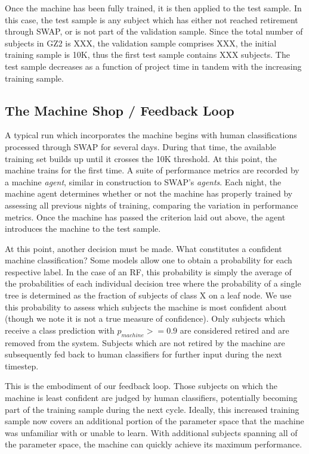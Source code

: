 \documentclass[twocolumn]{aastex6}
\begin{document}
Once the machine has been fully trained, it is then applied to the test sample. 
In this case, the test sample is any subject which has either not reached retirement
through SWAP, or is not part of the validation sample. Since the 
total number of subjects in GZ2 is XXX, the validation sample comprises XXX, 
the initial training sample is 10K, thus the first test sample contains XXX subjects. 
The test sample decreases as a function of project time in tandem with the increasing
training sample. 


\subsection{The Machine Shop / Feedback Loop}
A typical run which incorporates the machine begins with human classifications 
processed through SWAP for several days. During that time, the available training set
builds up until it crosses the 10K threshold. At this point, the machine trains for the 
first time. A suite of performance metrics are recorded by a machine \textit{agent}, similar
in construction to SWAP's \textit{agents}. Each night, the machine agent determines 
whether or not the machine has properly trained by assessing all previous nights of 
training, comparing the variation in performance metrics. Once the machine has
passed the criterion laid out above, the agent introduces the machine to the test sample.

At this point, another decision must be made. What constitutes a confident machine
classification? Some models allow one to obtain a probability for each respective label. 
In the case of an RF, this probability is simply the average of the probabilities of each 
individual decision tree where the probability of a single tree is determined as the fraction
of subjects of class X on a leaf node.  We use this probability to assess which subjects
the machine is most confident about (though we note it is not a true measure of confidence).
Only subjects which receive a class prediction with $p_{machine} >= 0.9$ are considered
retired and are removed from the system. Subjects which are not retired by the machine 
are subsequently fed back to human classifiers for further input during the next timestep.  

This is the embodiment of our feedback loop. Those subjects on which the machine
is least confident are judged by human classifiers, potentially becoming part of the
training sample during the next cycle. Ideally, this increased training sample now 
covers an additional portion of the parameter space that the machine was unfamiliar
with or unable to learn. With additional subjects spanning all of the parameter space, 
the machine can quickly achieve its maximum performance. 
\end{document}
